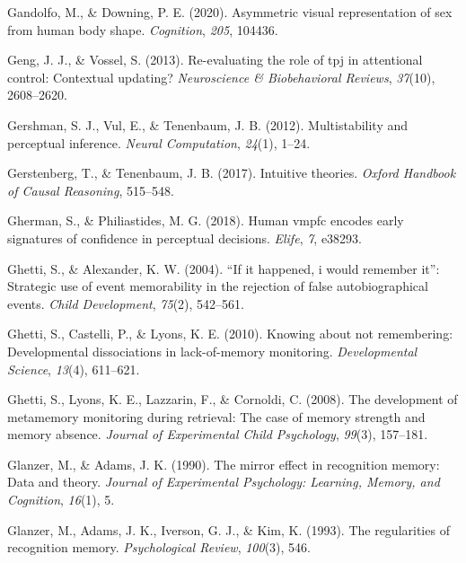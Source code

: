 \documentclass[12pt,twoside]{reedthesis}
\begin{document}
\leavevmode\hypertarget{ref-gandolfo2020asymmetric}{}%
Gandolfo, M., \& Downing, P. E. (2020). Asymmetric visual representation of sex from human body shape. \emph{Cognition}, \emph{205}, 104436.

\leavevmode\hypertarget{ref-geng2013re}{}%
Geng, J. J., \& Vossel, S. (2013). Re-evaluating the role of tpj in attentional control: Contextual updating? \emph{Neuroscience \& Biobehavioral Reviews}, \emph{37}(10), 2608--2620.

\leavevmode\hypertarget{ref-gershman2012multistability}{}%
Gershman, S. J., Vul, E., \& Tenenbaum, J. B. (2012). Multistability and perceptual inference. \emph{Neural Computation}, \emph{24}(1), 1--24.

\leavevmode\hypertarget{ref-gerstenberg2017intuitive}{}%
Gerstenberg, T., \& Tenenbaum, J. B. (2017). Intuitive theories. \emph{Oxford Handbook of Causal Reasoning}, 515--548.

\leavevmode\hypertarget{ref-gherman2018human}{}%
Gherman, S., \& Philiastides, M. G. (2018). Human vmpfc encodes early signatures of confidence in perceptual decisions. \emph{Elife}, \emph{7}, e38293.

\leavevmode\hypertarget{ref-ghetti2004if}{}%
Ghetti, S., \& Alexander, K. W. (2004). ``If it happened, i would remember it'': Strategic use of event memorability in the rejection of false autobiographical events. \emph{Child Development}, \emph{75}(2), 542--561.

\leavevmode\hypertarget{ref-ghetti2010knowing}{}%
Ghetti, S., Castelli, P., \& Lyons, K. E. (2010). Knowing about not remembering: Developmental dissociations in lack-of-memory monitoring. \emph{Developmental Science}, \emph{13}(4), 611--621.

\leavevmode\hypertarget{ref-ghetti2008development}{}%
Ghetti, S., Lyons, K. E., Lazzarin, F., \& Cornoldi, C. (2008). The development of metamemory monitoring during retrieval: The case of memory strength and memory absence. \emph{Journal of Experimental Child Psychology}, \emph{99}(3), 157--181.

\leavevmode\hypertarget{ref-glanzer1990mirror}{}%
Glanzer, M., \& Adams, J. K. (1990). The mirror effect in recognition memory: Data and theory. \emph{Journal of Experimental Psychology: Learning, Memory, and Cognition}, \emph{16}(1), 5.

\leavevmode\hypertarget{ref-glanzer1993regularities}{}%
Glanzer, M., Adams, J. K., Iverson, G. J., \& Kim, K. (1993). The regularities of recognition memory. \emph{Psychological Review}, \emph{100}(3), 546.
\end{document}
